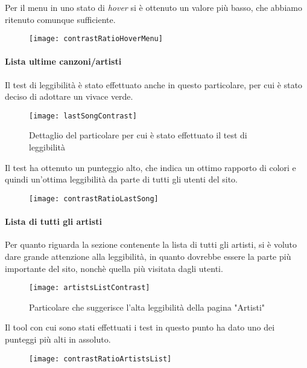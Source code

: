 Per il menu in uno stato di \textit{hover} si è ottenuto un valore più basso, che abbiamo ritenuto comunque sufficiente.
\begin{figure}[H]

    \centering
    \texttt{[image: contrastRatioHoverMenu]}

\end{figure}


\paragraph*{Lista ultime canzoni/artisti}Il test di leggibilità è stato effettuato anche in questo particolare, per cui è stato deciso di adottare un vivace verde.
\begin{figure}[H]

    \centering
    \texttt{[image: lastSongContrast]}
    \caption{Dettaglio del particolare per cui è stato effettuato il test di leggibilità}

\end{figure}

Il test ha ottenuto un punteggio alto, che indica un ottimo rapporto di colori e quindi un'ottima leggibilità da parte di tutti gli utenti del sito.
\begin{figure}[H]

    \centering
    \texttt{[image: contrastRatioLastSong]}

\end{figure}

\paragraph*{Lista di tutti gli artisti}
Per quanto riguarda la sezione contenente la lista di tutti gli artisti, si \`e voluto dare grande attenzione alla leggibilit\`a, in quanto dovrebbe essere la parte pi\`u importante del sito, nonch\`e quella pi\`u visitata dagli utenti.


\begin{figure}[H]

    \centering
    \texttt{[image: artistsListContrast]}
    \caption{Particolare che suggerisce l'alta leggibilità della pagina "Artisti"}

\end{figure}

Il tool con cui sono stati effettuati i test in questo punto ha dato uno dei punteggi più alti in assoluto.
\begin{figure}[H]

    \centering
    \texttt{[image: contrastRatioArtistsList]}

\end{figure}

